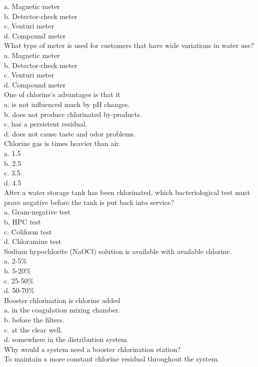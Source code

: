 a.	Magnetic meter\\
b.	Detector-check meter\\
c.	Venturi meter\\
d.	Compound meter\\
What type of meter is used for customers that have wide variations in water use?\\
a.	Magnetic meter\\
b.	Detector-check meter\\
c.	Venturi meter\\
d.	Compound meter\\
One of chlorine's advantages is that it\\
a.	is not influenced much by pH changes.\\
b.	does not produce chlorinated by-products.\\
c.	has a persistent residual.\\
d.	does not cause taste and odor problems.\\
Chlorine gas is	times heavier than air.\\
a.	1.5\\
b.	2.5\\
c.	3.5\\
d.	4.5\\
After a water storage tank has been chlorinated, which bacteriological test must prove negative before the tank is put back into service?\\
a.	Gram-negative test\\
b.	HPC test\\
c.	Coliform test\\
d.	Chloramine test\\
Sodium hypochlorite (NaOCl) solution is available with	available chlorine.\\
a.	2-5\%\\
b.	5-20\%\\
c.	25-50\%\\
d.	50-70\%\\
Booster chlorination is chlorine added\\
a.	in the coagulation mixing chamber.\\
b.	before the filters.\\
c.	at the clear well.\\
d.	somewhere in the distribution system.\\
Why would a system need a booster chlorination station?\\
To maintain a more constant chlorine residual throughout the system.\\
